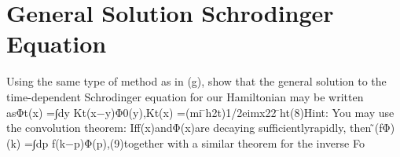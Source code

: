 \documentclass{article}
\begin{document}
\section{General Solution Schrodinger Equation}

Using  the  same  type  of  method  as  in  (g),  show  that  the  general  solution  to  the  time-dependent Schrodinger equation for our Hamiltonian may be written asΦt(x) =∫dy Kt(x−y)Φ0(y),Kt(x) =(mi ̄h2t)1/2eimx22 ̄ht(8)Hint:  You may use the convolution theorem:  Iff(x)andΦ(x)are decaying sufficientlyrapidly, then ̃(fΦ)(k) =∫dp f(k−p)Φ(p),(9)together with a similar theorem for the inverse Fo
\end{document}
